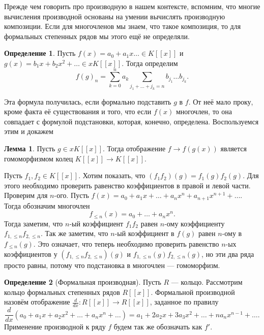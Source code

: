 \documentclass[10pt,a4paper,oneside]{book}
\theoremstyle{definition}
\newtheorem*{defn}{Определение}
\newtheorem{lem}{Лемма}
\def\dfn{\begin{defn}}
\def\edfn{\end{defn}}
\def\lm{\begin{lem}}
\def\elm{\end{lem}}
\begin{document}
Прежде чем говорить про производную в нашем контексте, вспомним, что многие вычисления производной основаны на умении вычислять производную композиции. Если для многочленов мы знаем, что такое композиция, то для формальных степенных рядов мы этого ещё не определяли.

\dfn Пусть $f(x)=a_0+ a_1x\dots\in K[[x]]$ и $g(x)= b_1x+b_2x^2+\dots \in xK[[x]]$. Тогда определим
$$f(g)_n= \sum_{k=0}^n a_k\sum_{j_1+\dots+j_k=n} b_{j_1}\dots b_{j_k}.$$
\edfn

Эта формула получилась, если формально подставить $g$ в $f$. От неё мало проку, кроме факта её существования и того, что если $f(x)$ многочлен, то она совпадает с формулой подстановки, которая, конечно, определена. Воспользуемся этим и докажем

\lm Пусть $g\in xK[[x]]$. Тогда отображение $f \to f(g(x))$ является гомоморфизмом колец $K[[x]]\to K[[x]]$.
\elm
\proof Пусть $f_1, f_2 \in K[[x]]$. Хотим показать, что $(f_1f_2)(g)=f_1(g)f_2(g)$. Для этого необходимо проверить равенство коэффициентов в правой и левой части. Проверим для $n$-ого. Пусть $f(x)= a_0+a_1x+\dots+a_nx^n+a_{n+1}x^{n+1}+\dots$. Тогда обозначим многочлен
$$f_{\leq n}(x)=a_0+\dots+a_nx^n.$$
Тогда заметим, что $n$-ый коэффициент $f_1f_2$ равен $n$-ому коэффициенту $f_{1,\leq n}f_{2,\leq n}$. Так же заметим, что $n$-ый коэффициент в $f(g)$ равен $n$-ому в $f_{\leq n}(g)$. Это означает, что теперь необходимо проверить равенство $n$-ых коэффициентов у $(f_{1,\leq n}f_{2,\leq n})(g)$ и $f_{1,\leq n}(g)f_{2,\leq n}(g)$, но эти два ряда просто равны, потому что подстановка в многочлен --- гомоморфизм. \endproof

\dfn[Формальная производная] Пусть $R$ --- кольцо. Рассмотрим кольцо формальных степенных рядов $R[[x]]$. Формальной производной назовём отображение
$\frac{d}{dx}\colon R[[x]]\to R[[x]]$, заданное по правилу
$$\frac{d}{dx}(a_0+a_1x+a_2x^2+\dots+a_nx^n+\dots) = a_1+2a_2x+3a_3x^2+\dots+na_nx^{n-1}+\dots.$$
Применение производной к ряду $f$ будем так же обозначать как $f'$.
\edfn
\end{document}
